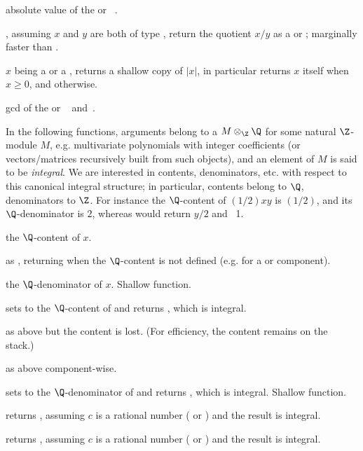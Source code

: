  absolute value of the  or
~.

, assuming $x$ and $y$
are both of type , return the quotient $x/y$ as a  or
; marginally faster than .

 $x$ being a  or a , returns
a shallow copy of $|x|$, in particular returns $x$ itself when $x \geq 0$, and
 otherwise.

 gcd of the  or ~
and~.
\smallskip

In the following functions, arguments belong to a $M\otimes_\Z\Q$
for some natural $\Z$-module $M$, e.g. multivariate polynomials with integer
coefficients (or vectors/matrices recursively built from such objects), and
an element of $M$ is said to be \emph{integral}.
We are interested in contents, denominators, etc. with respect to this
canonical integral structure; in particular, contents belong to $\Q$,
denominators to $\Z$. For instance the $\Q$-content of $(1/2)xy$ is $(1/2)$,
and its $\Q$-denominator is $2$, whereas  would return $y/2$ and
~1.

 the $\Q$-content of $x$.

 as , returning
 when the $\Q$-content is not defined (e.g. for a 
or  component).

 the $\Q$-denominator of $x$. Shallow function.

 sets  to the $\Q$-content
of  and returns , which is integral.

 as above but the content is lost. (For
efficiency, the content remains on the stack.)

 as above component-wise.

 sets  to the
$\Q$-denominator of  and returns , which is integral.
Shallow function.

 returns , assuming $c$
is a rational number ( or ) and the result is integral.

 returns , assuming $c$
is a rational number ( or ) and the result is integral.

